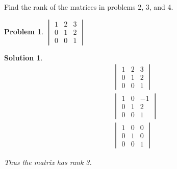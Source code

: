 \documentclass{article}
\newtheorem{problem}{Problem}
\newtheorem*{solution}{Solution}
\begin{document}
Find the rank of the matrices in problems 2, 3, and 4.

\begin{problem}
$\begin{vmatrix}
1 & 2 & 3 \\
0 & 1 & 2 \\
0 & 0 & 1
\end{vmatrix}$
\end{problem}

\begin{solution}
\begin{align*}
& \begin{vmatrix}
1 & 2 & 3 \\
0 & 1 & 2 \\
0 & 0 & 1
\end{vmatrix} \\
&\begin{vmatrix}
1 & 0 & -1 \\
0 & 1 & 2 \\
0 & 0 & 1
\end{vmatrix} \\
&\begin{vmatrix}
1 & 0 & 0 \\
0 & 1 & 0 \\
0 & 0 & 1
\end{vmatrix}
\end{align*}

Thus the matrix has rank 3.

\end{solution}
\end{document}
